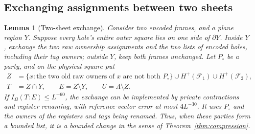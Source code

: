 \documentclass[11pt]{article}
\numberwithin{equation}{section}
\newtheorem{lemma}[theorem]{Lemma}
\theoremstyle{definition}
\theoremstyle{remark}
\begin{document}
\subsection{Exchanging assignments between two sheets}

\begin{lemma}[Two-sheet exchange]\label{lem:exchange}
Consider two encoded frames, and a plane region $Y$.  Suppose every hole's
entire outer square lies on one side of $\partial Y$.  Inside $Y$, exchange
the two raw ownership assignments and the two lists of encoded holes,
including their tag owners; outside $Y$, keep both frames unchanged.
Let $P_\circ$ be a party, and on the physical square put
\begin{align}
 Z&=\{x:\text{the two old raw owners of }x
                         \text{ are not both }P_\circ\}
                  \cup H^+(\mathcal F_1)\cup H^+(\mathcal F_2),
                 \label{eq:exchange-Z}\\
 T&=Z\cap Y,\qquad E=Z\setminus Y,\qquad
 U=\Lambda\setminus Z.\label{eq:exchange-partition}
\end{align}
If $I_\Omega(T:E)\le L^{-60}$, the exchange can be implemented by private
contractions and register renaming, with reference-vector error at most
$4L^{-30}$.  It uses $P_\circ$ and the owners of the registers and tags
being renamed.  Thus, when these parties form a bounded list, it is a
bounded change in the sense of Theorem~\ref{thm:compression}.
\end{lemma}
\end{document}
